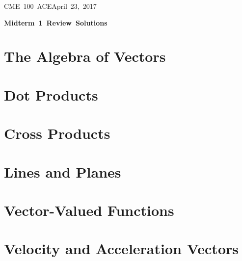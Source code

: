 \documentclass[letterpaper, 11pt]{article}
\makeatletter
\newcommand{\hmwkTitle}{Midterm\ 1\ Review\ Solutions} %
\newcommand{\hmwkClass}{CME\ 100\ ACE} %
\newcommand{\hmwkAuthorName}{T Anderson, S Messingher, A Kusimo} %
\newcommand{\hmwkAuthorEmail}{timmya@stanford.edu} %
\makeatother
\begin{document}
\noindent
\normalsize 
\hmwkClass \hfill April\ 23,\ 2017\\

\begin{center} \Large \textbf{\hmwkTitle} \end{center}

\section{The Algebra of Vectors}

\section{Dot Products}

\section{Cross Products}

\section{Lines and Planes}

\section{Vector-Valued Functions}

\section{Velocity and Acceleration Vectors}
\end{document}
